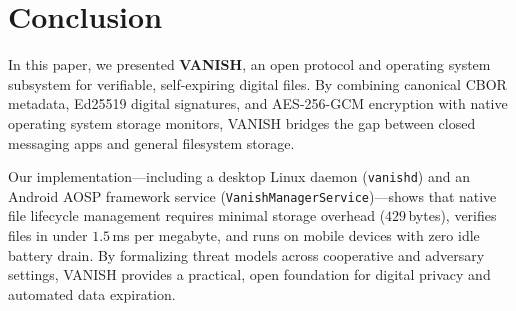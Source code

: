 \section{Conclusion}
\label{sec:conclusion}

In this paper, we presented \textbf{VANISH}, an open protocol and operating system subsystem for verifiable, self-expiring digital files. By combining canonical CBOR metadata, Ed25519 digital signatures, and AES-256-GCM encryption with native operating system storage monitors, VANISH bridges the gap between closed messaging apps and general filesystem storage.

Our implementation—including a desktop Linux daemon (\texttt{vanishd}) and an Android AOSP framework service (\texttt{VanishManagerService})—shows that native file lifecycle management requires minimal storage overhead ($429$\,bytes), verifies files in under $1.5$\,ms per megabyte, and runs on mobile devices with zero idle battery drain. By formalizing threat models across cooperative and adversary settings, VANISH provides a practical, open foundation for digital privacy and automated data expiration.
